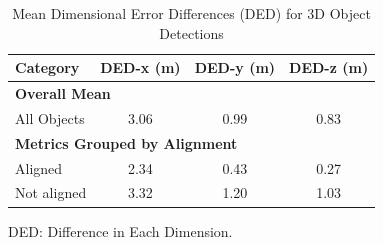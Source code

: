 \begin{table}[h!]
    \centering
    \begin{tabular}{|l|c|c|c|}
        \hline
        \textbf{Category} & \textbf{DED-x (m)} & \textbf{DED-y (m)} & \textbf{DED-z (m)} \\
        \hline
        
        \multicolumn{4}{|l|}{\textbf{Overall Mean}} \\
        \hline
        All Objects & 3.06 & 0.99 & 0.83 \\
        \hline

        \multicolumn{4}{|l|}{\textbf{Metrics Grouped by Alignment}} \\
        \hline
        Aligned & 2.34 & 0.43 & 0.27 \\
        Not aligned & 3.32 & 1.20 & 1.03 \\
        \hline
    \end{tabular}
    \begin{tablenotes}
        \item[] DED: Difference in Each Dimension.
    \end{tablenotes}
    \caption{Mean Dimensional Error Differences (DED) for 3D Object Detections}
    \label{tab:combined_ded_metrics}
\end{table}






